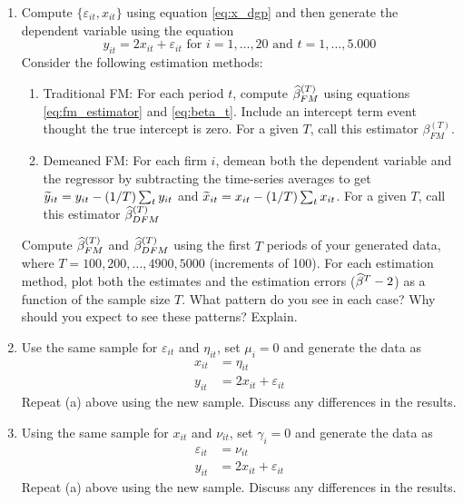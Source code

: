 \begin{enumerate}[label = (\alph*)]
\item  Compute \(\lbrace \varepsilon_{it}, x_{it}\rbrace\) using equation \ref{eq:x_dgp} and then generate the dependent variable using the equation
\[
    y_{it} = 2x_{it} + \varepsilon_{it} \text{ for } i = 1, \dots, 20 \text{ and } t = 1, \dots, 5.000
\]
Consider the following estimation methods:
\begin{enumerate}[label = \arabic*.]
    \item Traditional FM: For each period \(t\), compute \(\widehat{\beta}^{(T)}_{FM}\) using equations \ref{eq:fm_estimator} and \ref{eq:beta_t}. Include an intercept term event thought the true intercept is zero. For a given \(T\), call this estimator \(\beta^{(T)}_{FM}\).
    \item Demeaned FM: For each firm \(i\), demean both the dependent variable and the regressor by subtracting the time-series averages to get \(\widetilde{y}_{it} = y_{it} - \left( 1/T \right)\sum_t y_{it}\) and \(\widetilde{x}_{it} = x_{it} - \left( 1/T \right)\sum_t x_{it}\). For a given \(T\), call this estimator \(\widehat{\beta}^{(T)}_{DFM}\)
\end{enumerate}
Compute \(\widehat{\beta}^{(T)}_{FM}\) and \(\widehat{\beta}^{(T)}_{DFM}\) using the first \(T\) periods of your generated data, where \(T = 100, 200, \dots, 4900, 5000\) (increments of 100). For each estimation method, plot both the estimates and the estimation errors (\(\widehat{\beta}^T-2\)) as a function of the sample size \(T\). What pattern do you see in each case? Why should you expect to see these patterns? Explain.

\item Use the same sample for \(\varepsilon_{it}\) and \(\eta_{it}\), set \(\mu_i = 0\) and generate the data as
\begin{align*}
    x_{it} & = \eta_{it} \\
    y_{it} & = 2x_{it} + \varepsilon_{it}
\end{align*}
Repeat (a) above using the new sample. Discuss any differences in the results.

\item Using the same sample for \(x_{it}\) and \(\nu_{it}\), set \(\gamma_i = 0\) and generate the data as
\begin{align*}
    \varepsilon_{it} & = \nu_{it} \\
    y_{it} & = 2x_{it} + \varepsilon_{it}
\end{align*}
Repeat (a) above using the new sample. Discuss any differences in the results.


\end{enumerate}
